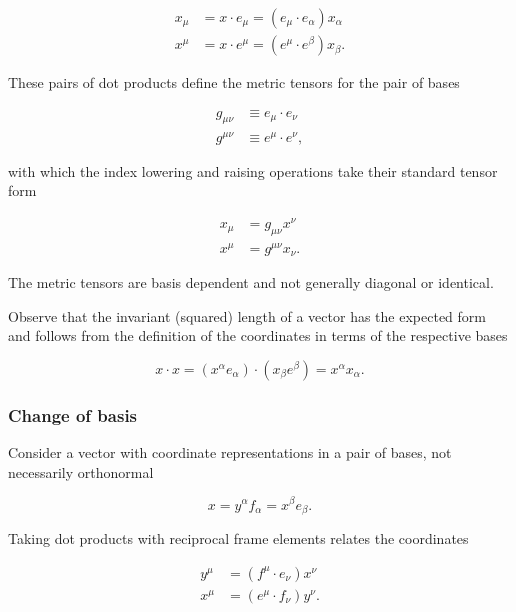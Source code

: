\begin{align}\label{eqn:gramSchmidtLorentz:1000}
x_\mu &= x \cdot e_\mu = (e_\mu \cdot e_\alpha) x_\alpha \\
x^\mu &= x \cdot e^\mu = (e^\mu \cdot e^\beta) x_\beta.
\end{align}

These pairs of dot products define the metric tensors for the pair of bases

\begin{align}\label{eqn:gramSchmidtLorentz:1020}
g_{\mu \nu} &\equiv e_\mu \cdot e_\nu \\
g^{\mu \nu} &\equiv e^\mu \cdot e^\nu,
\end{align}

with which the index lowering and raising operations take their standard tensor form

\begin{align}\label{eqn:gramSchmidtLorentz:1040}
x_\mu &= g_{\mu \nu} x^\nu \\
x^\mu &= g^{\mu \nu} x_\nu.
\end{align}

The metric tensors are basis dependent and not generally diagonal or identical.

Observe that the invariant (squared) length of a vector has the expected form and follows from the definition of the coordinates in terms of the respective bases

\begin{equation}\label{eqn:gramSchmidtLorentz:1060}
x \cdot x = (x^\alpha e_\alpha) \cdot (x_\beta e^\beta) = x^\alpha x_\alpha.
\end{equation}

\subsubsection{Change of basis}

Consider a vector with coordinate representations in a pair of bases, not necessarily orthonormal

\begin{equation}\label{eqn:gramSchmidtLorentz:1080}
x = y^\alpha f_\alpha = x^\beta e_\beta.
\end{equation}

Taking dot products with reciprocal frame elements relates the coordinates

\begin{align}\label{eqn:gramSchmidtLorentz:1100}
y^\mu &= (f^\mu \cdot e_\nu ) x^\nu \\
x^\mu &= (e^\mu \cdot f_\nu) y^\nu.
\end{align}

